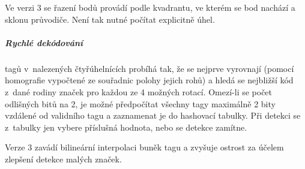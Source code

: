   Ve verzi 3 se řazení bodů provádí podle kvadrantu, ve kterém se bod nachází a sklonu průvodiče. Není tak nutné počítat explicitně úhel. \cite{apriltag3}

  \subparagraph{Rychlé dekódování} tagů v~nalezených čtyřúhelnících probíhá tak, že se nejprve vyrovnají (pomocí homografie vypočtené ze souřadnic polohy jejich rohů) a hledá se nejbližší kód z~dané rodiny značek pro každou ze 4 možných rotací. Omezí-li se počet odlišných bitů na 2, je možné předpočítat všechny tagy maximálně 2 bity vzdálené od validního tagu a zaznamenat je do hashovací tabulky. Při detekci se z~tabulky jen vybere příslušná hodnota, nebo se detekce zamítne. \cite{apriltag2}
  
  Verze 3 zavádí bilineární interpolaci buněk tagu a zvyšuje ostrost za účelem zlepšení detekce malých značek. \cite{apriltag3}